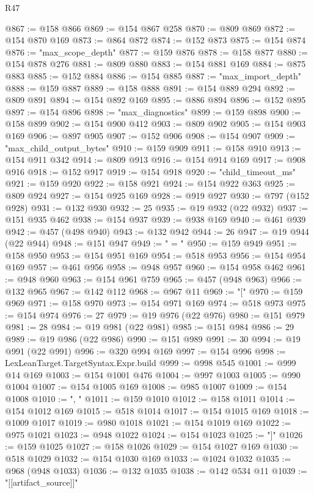 \begin{lexlean}{R47}
\begin{coremodule}
@867 := @158 @866
@869 := @154 @867 @258
@870 := @809 @869
@872 := @154 @870 @169
@873 := @864 @872
@874 := @152 @873
@875 := @154 @874
@876 := "max_scope_depth"
@877 := @159 @876
@878 := @158 @877
@880 := @154 @878 @276
@881 := @809 @880
@883 := @154 @881 @169
@884 := @875 @883
@885 := @152 @884
@886 := @154 @885
@887 := "max_import_depth"
@888 := @159 @887
@889 := @158 @888
@891 := @154 @889 @294
@892 := @809 @891
@894 := @154 @892 @169
@895 := @886 @894
@896 := @152 @895
@897 := @154 @896
@898 := "max_diagnostics"
@899 := @159 @898
@900 := @158 @899
@902 := @154 @900 @412
@903 := @809 @902
@905 := @154 @903 @169
@906 := @897 @905
@907 := @152 @906
@908 := @154 @907
@909 := "max_child_output_bytes"
@910 := @159 @909
@911 := @158 @910
@913 := @154 @911 @342
@914 := @809 @913
@916 := @154 @914 @169
@917 := @908 @916
@918 := @152 @917
@919 := @154 @918
@920 := "child_timeout_ms"
@921 := @159 @920
@922 := @158 @921
@924 := @154 @922 @363
@925 := @809 @924
@927 := @154 @925 @169
@928 := @919 @927
@930 := @797 (@152 @928)
@931 := @132 @930
@932 := 25
@935 := @19 @932 (@22 @932)
@937 := @151 @935 @462
@938 := @154 @937
@939 := @938 @169
@940 := @461 @939
@942 := @457 (@498 @940)
@943 := @132 @942
@944 := 26
@947 := @19 @944 (@22 @944)
@948 := @151 @947
@949 := " = "
@950 := @159 @949
@951 := @158 @950
@953 := @154 @951 @169
@954 := @518 @953
@956 := @154 @954 @169
@957 := @461 @956
@958 := @948 @957
@960 := @154 @958 @462
@961 := @948 @960
@963 := @154 @961 @759
@965 := @457 (@948 @963)
@966 := @132 @965
@967 := @142 @112
@968 := @967 @11
@969 := "["
@970 := @159 @969
@971 := @158 @970
@973 := @154 @971 @169
@974 := @518 @973
@975 := @154 @974
@976 := 27
@979 := @19 @976 (@22 @976)
@980 := @151 @979
@981 := 28
@984 := @19 @981 (@22 @981)
@985 := @151 @984
@986 := 29
@989 := @19 @986 (@22 @986)
@990 := @151 @989
@991 := 30
@994 := @19 @991 (@22 @991)
@996 := @320 @994 @169
@997 := @154 @996
@998 := LexLeanTarget.TargetSyntax.Expr.build
@999 := @998 @545
@1001 := @999 @14 @169
@1003 := @154 @1001 @476
@1004 := @997 @1003
@1005 := @990 @1004
@1007 := @154 @1005 @169
@1008 := @985 @1007
@1009 := @154 @1008
@1010 := ", "
@1011 := @159 @1010
@1012 := @158 @1011
@1014 := @154 @1012 @169
@1015 := @518 @1014
@1017 := @154 @1015 @169
@1018 := @1009 @1017
@1019 := @980 @1018
@1021 := @154 @1019 @169
@1022 := @975 @1021
@1023 := @948 @1022
@1024 := @154 @1023
@1025 := "]"
@1026 := @159 @1025
@1027 := @158 @1026
@1029 := @154 @1027 @169
@1030 := @518 @1029
@1032 := @154 @1030 @169
@1033 := @1024 @1032
@1035 := @968 (@948 @1033)
@1036 := @132 @1035
@1038 := @142 @534 @11
@1039 := "[[artifact_source]]"

\end{coremodule}
\end{lexlean}
